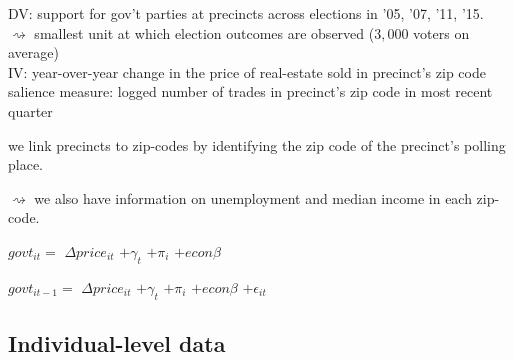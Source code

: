 \documentclass[10pt,aspectratio=169]{beamer}
\begin{document}
\begin{frame}
DV: support for gov't parties at precincts across elections in '05, '07, '11, '15. \\
$\rightsquigarrow$  smallest unit at which election outcomes are observed ($3,000$ voters on average) \\

\vspace{0.2in} \pause
IV: year-over-year change in the price of real-estate sold in precinct's zip code \\

\vspace{0.2in} \pause
salience measure: logged number of trades in precinct's zip code in most recent quarter

\pause

\vspace{0.2in}

we link precincts to zip-codes by identifying the zip code of the precinct's polling place.

$\rightsquigarrow$  we also have information on unemployment and median income in each zip-code.



\end{frame}

\begin{frame} 
\begin{center}	
\huge{ \noindent $govt_{it}=$  $\Delta price_{it} $ \only<1>{$+ \epsilon_{it}$} \pause $+ \gamma_t$  \pause $+ \pi_i$  \pause  $+ econ \beta$  \pause

\vspace{0.2in}
\noindent $govt_{it-1}=$  $\Delta price_{it} $ $+ \gamma_t$ $+ \pi_i$  $+ econ \beta$ $+ \epsilon_{it}$
}
\end{center}
\end{frame}







\subsection{Individual-level data}
\end{document}
